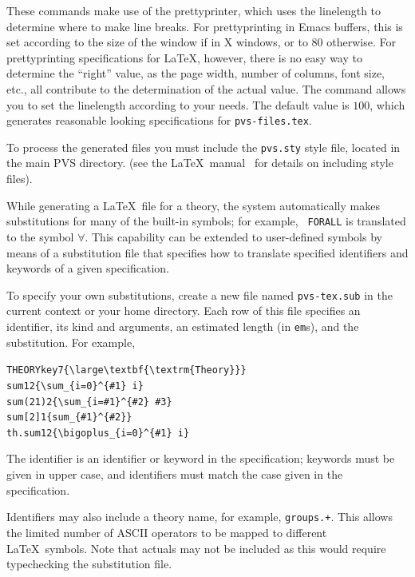 These commands make use of the prettyprinter, which uses the linelength to
determine where to make line breaks.  For prettyprinting in Emacs buffers,
this is set according to the size of the window if in X windows, or to
$80$ otherwise.  For prettyprinting specifications for \LaTeX, however,
there is no easy way to determine the ``right'' value, as the page width,
number of columns, font size, etc., all contribute to the determination of
the actual value.  The  command allows you to
set the linelength according to your needs.  The default value is $100$,
which generates reasonable looking specifications for
\texttt{pvs-files.tex}.

To process the generated files you must include the \texttt{pvs.sty}
style file, located in the main PVS directory. (see the \LaTeX\
manual~\cite{latex2e} for details on including style files).  

While generating a \LaTeX\ file for a theory, the system automatically
makes substitutions for many of the built-in symbols; for example, {\tt
FORALL} is translated to the symbol $\forall$.  This capability can be
extended to user-defined symbols by means of a substitution file that
specifies how to translate specified identifiers and keywords of a given
specification.

To specify your own substitutions, create a new file named
\texttt{pvs-tex.sub} in the current context or your home directory.  Each
row of this file specifies an identifier, its kind and arguments, an
estimated length (in \texttt{em}s), and the substitution.  For example,
{\small\begin{alltt}
  THEORY key 7 \verb|{\large\textbf{\textrm{Theory}}}|
  sum 1 2 \verb|{\sum_{i=0}^{#1} i}|
  sum (2 1) 2 \verb|{\sum_{i=#1}^{#2} #3}|
  sum [2] 1 \verb|{sum_{#1}^{#2}}|
  th.sum 1 2 \verb|{\bigoplus_{i=0}^{#1} i}|
\end{alltt}}
The identifier is an identifier or keyword in the specification;
keywords must be given in upper case, and identifiers must match the
case given in the specification.

Identifiers may also include a theory name, for example,
\texttt{groups.+}.  This allows the limited number of ASCII operators to
be mapped to different \LaTeX\ symbols.  Note that actuals may not be
included as this would require typechecking the substitution file.


